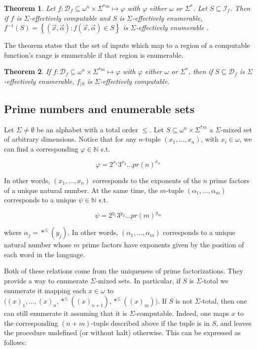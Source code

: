 \documentclass[a4paper, 12pt]{article}
\newtheorem{theorem}{Theorem}
\newtheorem{theorem}{Theorem}
\begin{document}
\begin{theorem}
    Let $f : \mathcal{D}_f \subseteq \omega^{n} \times \Sigma^{*m} \mapsto \varphi$ with
    $\varphi$ either $\omega$ or $\Sigma^{*}$. Let $S \subseteq \mathcal{I}_f$.
    Then if $f$ is $\Sigma$-effectively computable and $S$ is
    $\Sigma$-effectively enumerable, $f^{-1}(S) = \left\{ (\vec{x},
    \vec{\alpha}) : f(\vec{x}, \vec{\alpha}) \in S \right\} $ is
    $\Sigma$-effectively enumerable .
\end{theorem}

The theorem states that the set of inputs which map to a region of a computable
function's range is enumerable if that region is enumerable.

\begin{theorem}
    If $f : \mathcal{D}_f \subseteq \omega^{n} \times \Sigma^{*m} \mapsto
    \varphi$ with $\varphi$ either $\omega$ or $\Sigma^{*}$, then if $S
    \subseteq \mathcal{D}_f$ is $\Sigma$-effectively enumerable, $f_{| S}$ is
    $\Sigma$-effectively computable.
\end{theorem}



\subsection{Prime numbers and enumerable sets}

Let $\Sigma \neq \emptyset$ be an alphabet with a total order $\leq$. Let $S
\subseteq \omega^{n} \times \Sigma^{*m}$ a $\Sigma$-mixed set of arbitrary
dimensions. Notice that for any $n$-tuple $(x_1, \ldots, x_n)$, with $x_i \in
\omega$, we can find a corresponding $\varphi \in \mathbb{N}$ s.t. 

$$
\varphi = 2^{x_1}3^{x_2} \ldots pr(n)^{x_n}
$$

In other words, $(x_1, \ldots, x_n)$ corresponds to the exponents of the $n$
prime factors of a unique natural number. At the same time, the $m$-tuple
$(\alpha_1, \ldots, \alpha_m)$ corresponds to a unique $\psi \in \mathbb{N}$
s.t. 

$$
\psi = 2^{y_1}3^{y_2}\ldots pr(m)^{y_m}
$$

where $\alpha_j = *^{\leq}(y_j)$. In other words, $(\alpha_1, \ldots, \alpha_m)$
corresponds to a unique natural number whose $m$ prime factors have exponents
given by the position of each word in the language.

Both of these relations come from the uniqueness of prime factorizations.
They provide a way to enumerate $\Sigma$-mixed sets. In
particular, if $S$ is $\Sigma$-total we enumerate it mapping each $x \in \omega$
to $\big((x)_1, \ldots, (x)_n, *^{\leq}((x)_{n+1}), *^{\leq}((x)_m)\big)$. If
$S$ is not $\Sigma$-total, then one can still enumerate it assuming that it is
$\Sigma$-computable. Indeed, one maps $x$ to the corresponding $(n+m)$-tuple
described above if the tuple is in $S$, and leaves the procedure undefined (or
without halt) otherwise. This can be expressed as follows:
\end{document}
